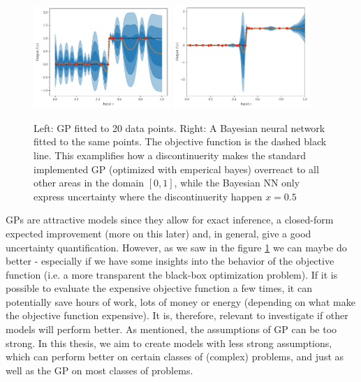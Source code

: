 \begin{figure}[H]%
    \centering
    {\includegraphics[width=0.46\textwidth]{Pictures/GP_vs_BNN1.pdf} }%
    \qquad
   {\includegraphics[width=0.46\textwidth]{Pictures/GP_vs_BNN2.pdf} }%
    \caption{Left: GP fitted to 20 data points. Right: A Bayesian neural network fitted to the same points.
    The objective function is the dashed black line. This examplifies how a discontinuerity makes the 
    standard implemented GP (optimized with emperical bayes) overreact to all other areas in the domain $[0,1]$,
    while the Bayesian NN only express uncertainty where the discontinuerity happen $x = 0.5$}%
    \label{fig:GP_vs_BNN}
\end{figure}



GPs are attractive models since they allow for exact inference, a closed-form expected improvement
 (more on this later) and, in general, give a good uncertainty quantification. However, as we saw in
 the figure \ref{fig:GP_vs_BNN} we can maybe do better - especially if we have some insights into
 the behavior of the objective function (i.e. a more transparent the black-box optimization
 problem). If it is possible to evaluate the expensive objective function
 a few times, it can potentially save hours of work, lots of money or energy (depending on what make the 
 objective function expensive). It is, therefore,
 relevant to investigate if other models will perform better. As mentioned, the assumptions of GP
 can be too strong. In this thesis, we aim to create models with less strong assumptions, which can
 perform better on certain classes of (complex) problems, and just as well as the GP on most classes
 of problems. 

